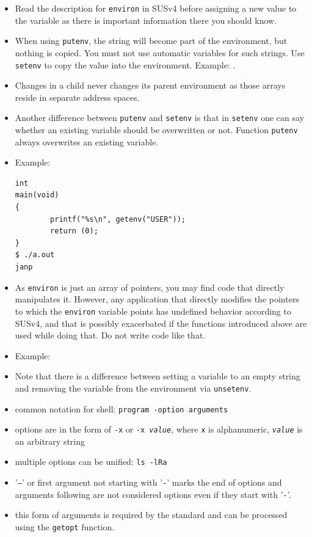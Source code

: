 \begin{itemize}
\item Read the description for \texttt{environ} in SUSv4 before assigning a new
value to the variable as there is important information there you should know.
\item When using \texttt{putenv}, the string will become part of the
environment, but nothing is copied.  You must not use automatic variables for such
strings.  Use \texttt{setenv} to copy the value into the environment.  Example:
.
\item Changes in a child never changes its parent environment as those arrays
reside in separate address spaces.
\item Another difference between \texttt{putenv} and \texttt{setenv} is that in
\texttt{setenv} one can say whether an existing variable should be overwritten
or not. Function \texttt{putenv} always overwrites an existing variable.
\item Example:

\begin{verbatim}
int
main(void)
{
        printf("%s\n", getenv("USER"));
        return (0);
}
$ ./a.out 
janp
\end{verbatim}

\item As \texttt{environ} is just an array of pointers, you may find code that
directly manipulates it.  However, any application that directly modifies the
pointers to which the \texttt{environ} variable points has undefined behavior according
to SUSv4, and that is possibly exacerbated if the functions introduced above are
used while doing that.  Do not write code like that.
\item Example: 
\item Note that there is a difference between setting a variable to an empty
string and removing the variable from the environment via \texttt{unsetenv}.
\end{itemize}


\begin{slide}
\begin{itemize}
\item common notation for shell: \verb#program -option arguments#
\item options are in the form of \texttt{-x} or \texttt{-x \emph{value}},
where \texttt{x} is alphanumeric, \texttt{\emph{value}} is an arbitrary string
\item multiple options can be unified: \texttt{ls -lRa}
\item '\texttt{--}' or first argument not starting with '\texttt{-}'
marks the end of options and arguments following are not considered options even
if they start with '\texttt{-}'.
\item this form of arguments is required by the standard and can be processed
using the \texttt{getopt} function.
\end{itemize}
\end{slide}

